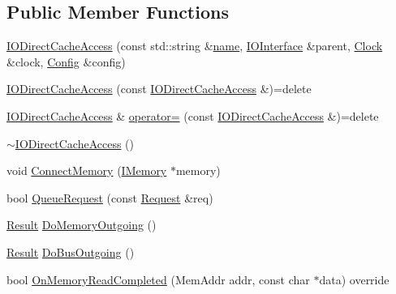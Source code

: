 \subsection*{Public Member Functions}
\begin{DoxyCompactItemize}
\item 
\hyperlink{class_simulator_1_1drisc_1_1_i_o_direct_cache_access_af5d87af60a6d3a01ad03a7ed36866e3b}{I\+O\+Direct\+Cache\+Access} (const std\+::string \&\hyperlink{mtconf_8c_a8f8f80d37794cde9472343e4487ba3eb}{name}, \hyperlink{class_simulator_1_1drisc_1_1_i_o_interface}{I\+O\+Interface} \&parent, \hyperlink{class_simulator_1_1_clock}{Clock} \&clock, \hyperlink{class_config}{Config} \&config)
\item 
\hyperlink{class_simulator_1_1drisc_1_1_i_o_direct_cache_access_a6bda7c841d3f1204b5b8498c147dd815}{I\+O\+Direct\+Cache\+Access} (const \hyperlink{class_simulator_1_1drisc_1_1_i_o_direct_cache_access}{I\+O\+Direct\+Cache\+Access} \&)=delete
\item 
\hyperlink{class_simulator_1_1drisc_1_1_i_o_direct_cache_access}{I\+O\+Direct\+Cache\+Access} \& \hyperlink{class_simulator_1_1drisc_1_1_i_o_direct_cache_access_ab56aff8f4710349beb271ea60eae70db}{operator=} (const \hyperlink{class_simulator_1_1drisc_1_1_i_o_direct_cache_access}{I\+O\+Direct\+Cache\+Access} \&)=delete
\item 
\hyperlink{class_simulator_1_1drisc_1_1_i_o_direct_cache_access_a51e39ef8f23efd1765d7ae482b534b3a}{$\sim$\+I\+O\+Direct\+Cache\+Access} ()
\item 
void \hyperlink{class_simulator_1_1drisc_1_1_i_o_direct_cache_access_ac0a9964a536de216a670d43aa9c5b116}{Connect\+Memory} (\hyperlink{class_simulator_1_1_i_memory}{I\+Memory} $\ast$memory)
\item 
bool \hyperlink{class_simulator_1_1drisc_1_1_i_o_direct_cache_access_a4361ea4bb5ba474cfa0312f016c4f114}{Queue\+Request} (const \hyperlink{struct_simulator_1_1drisc_1_1_i_o_direct_cache_access_1_1_request}{Request} \&req)
\item 
\hyperlink{namespace_simulator_a4b6b5616e7236c0c131516a441776805}{Result} \hyperlink{class_simulator_1_1drisc_1_1_i_o_direct_cache_access_a98025b8a45bd6acf3550e151100febef}{Do\+Memory\+Outgoing} ()
\item 
\hyperlink{namespace_simulator_a4b6b5616e7236c0c131516a441776805}{Result} \hyperlink{class_simulator_1_1drisc_1_1_i_o_direct_cache_access_a247f14a0302247776cd6930852d15c5d}{Do\+Bus\+Outgoing} ()
\item 
bool \hyperlink{class_simulator_1_1drisc_1_1_i_o_direct_cache_access_a3417d5dc8d5c1d7f62e90bf2b494e4ed}{On\+Memory\+Read\+Completed} (Mem\+Addr addr, const char $\ast$data) override

\end{DoxyCompactItemize}
